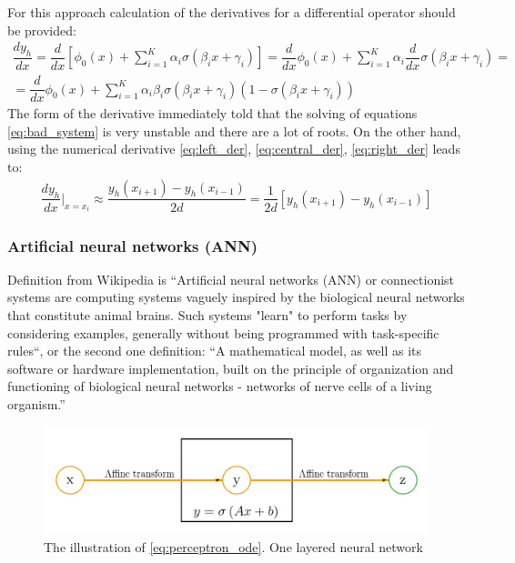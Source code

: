 For this approach calculation of the derivatives for a differential operator should be provided:
\begin{equation}
	\label{eq:bad_system}
	\begin{multlined}
		\dfrac{d y_h}{d x} = \dfrac{d}{d x} \left [ \phi_0(x) + \sum_{i = 1}^K \alpha_i \sigma(\beta_i x + \gamma_i) \right ] = \dfrac{d}{d x} \phi_0(x) + \sum_{i = 1}^K \alpha_i \dfrac{d}{d x} \sigma(\beta_i x + \gamma_i) = \\ = \dfrac{d}{d x} \phi_0(x) + \sum_{i = 1}^K \alpha_i \beta_i  \sigma(\beta_i x + \gamma_i) (1 - \sigma(\beta_i x + \gamma_i))
	\end{multlined}
\end{equation}
The form of the derivative immediately told that the solving of equations \eqref{eq:bad_system} is very unstable and there are a lot of roots. On the other hand, using the numerical derivative \eqref{eq:left_der}, \eqref{eq:central_der}, \eqref{eq:right_der} leads to:
\begin{equation}
	\label{eq:good_system}
	\begin{multlined}
		\dfrac{d y_h}{d x} \Big|_{x = x_i} \approx \dfrac{y_h(x_{i + 1}) - y_h(x_{i - 1})}{2d} = \dfrac{1}{2d} \left [ y_h(x_{i + 1}) - y_h(x_{i - 1}) \right ]
	\end{multlined}
\end{equation}

\subsubsection{Artificial neural networks (ANN)}	
Definition from Wikipedia is ``Artificial neural networks (ANN) or connectionist systems are computing systems vaguely inspired by the biological neural networks that constitute animal brains. Such systems "learn" to perform tasks by considering examples, generally without being programmed with task-specific rules``, or the second one definition: ``A mathematical model, as well as its software or hardware implementation, built on the principle of organization and functioning of biological neural networks - networks of nerve cells of a living organism.''
\begin{figure}[h]
	\centering
	\includegraphics[width=1 \textwidth]{images/chapter2/simple_net.png}
	\caption{The illustration of \eqref{eq:perceptron_ode}. One layered neural network}
	\label{fig:simple_net}
\end{figure}


